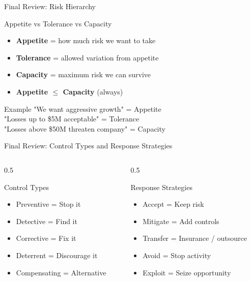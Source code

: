 \documentclass{beamer}
\begin{document}
	\begin{frame}{Final Review: Risk Hierarchy}
		\begin{block}{Appetite vs Tolerance vs Capacity}
			\begin{itemize}
				\item \textbf{Appetite} = how much risk we want to take
				\item \textbf{Tolerance} = allowed variation from appetite
				\item \textbf{Capacity} = maximum risk we can survive
				\item \textbf{Appetite $\le$ Capacity} (always)
			\end{itemize}
		\end{block}
		\begin{exampleblock}{Example}
			"We want aggressive growth" = Appetite \\
			"Losses up to \$5M acceptable" = Tolerance \\
			"Losses above \$50M threaten company" = Capacity
		\end{exampleblock}
	\end{frame}
	
	\begin{frame}{Final Review: Control Types and Response Strategies}
		\begin{columns}
			\begin{column}{0.5\textwidth}
				\begin{block}{Control Types}
					\begin{itemize}
						\item Preventive = Stop it
						\item Detective = Find it
						\item Corrective = Fix it
						\item Deterrent = Discourage it
						\item Compensating = Alternative
					\end{itemize}
				\end{block}
			\end{column}
			\begin{column}{0.5\textwidth}
				\begin{block}{Response Strategies}
					\begin{itemize}
						\item Accept = Keep risk
						\item Mitigate = Add controls
						\item Transfer = Insurance / outsource
						\item Avoid = Stop activity
						\item Exploit = Seize opportunity
					\end{itemize}
				\end{block}
			\end{column}
		\end{columns}
	\end{frame}
	
\end{document}

